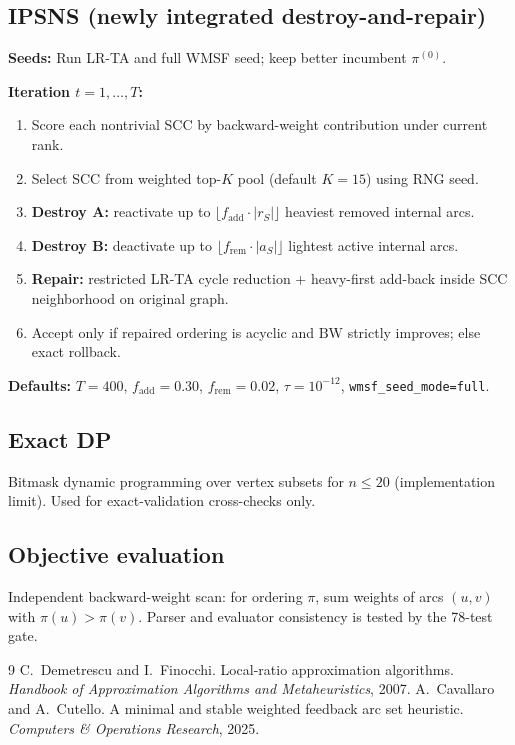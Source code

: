\subsection{IPSNS (newly integrated destroy-and-repair)}

\textbf{Seeds:} Run LR-TA and full WMSF seed; keep better incumbent $\pi^{(0)}$.

\textbf{Iteration $t=1,\ldots,T$:}
\begin{enumerate}
  \item Score each nontrivial SCC by backward-weight contribution under current rank.
  \item Select SCC from weighted top-$K$ pool (default $K=15$) using RNG seed.
  \item \textbf{Destroy A:} reactivate up to $\lfloor f_{\mathrm{add}}\cdot|r_S|\rfloor$ heaviest removed internal arcs.
  \item \textbf{Destroy B:} deactivate up to $\lfloor f_{\mathrm{rem}}\cdot|a_S|\rfloor$ lightest active internal arcs.
  \item \textbf{Repair:} restricted LR-TA cycle reduction + heavy-first add-back inside SCC neighborhood on original graph.
  \item Accept only if repaired ordering is acyclic and $\mathrm{BW}$ strictly improves; else exact rollback.
\end{enumerate}

\textbf{Defaults:} $T=400$, $f_{\mathrm{add}}=0.30$, $f_{\mathrm{rem}}=0.02$, $\tau=10^{-12}$, \texttt{wmsf\_seed\_mode=full}.

\subsection{Exact DP}

Bitmask dynamic programming over vertex subsets for $n\le 20$ (implementation limit). Used for exact-validation cross-checks only.

\subsection{Objective evaluation}

Independent backward-weight scan: for ordering $\pi$, sum weights of arcs $(u,v)$ with $\pi(u)>\pi(v)$. Parser and evaluator consistency is tested by the 78-test gate.

\begin{thebibliography}{9}
 C.~Demetrescu and I.~Finocchi. Local-ratio approximation algorithms. \emph{Handbook of Approximation Algorithms and Metaheuristics}, 2007.
 A.~Cavallaro and A.~Cutello. A minimal and stable weighted feedback arc set heuristic. \emph{Computers \& Operations Research}, 2025.
\end{thebibliography}

